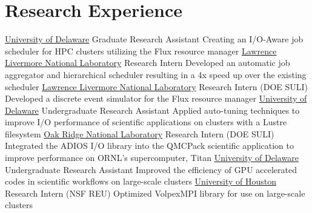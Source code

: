 \section{Research Experience}
		{\href{https://www.udel.edu}{University of Delaware}}
		{Graduate Research Assistant}
		{}{}
		{Creating an I/O-Aware job scheduler for HPC clusters utilizing the Flux resource manager}
		{\href{https://www.llnl.gov}{Lawrence Livermore National Laboratory}}
		{Research Intern}
		{}{}
		{Developed an automatic job aggregator and hierarchical scheduler resulting in a 4x speed up over the existing scheduler}
		{\href{https://www.llnl.gov}{Lawrence Livermore National Laboratory}}
		{Research Intern (DOE SULI)}
		{}{}
		{Developed a discrete event simulator for the Flux resource manager}
		{\href{http://www.udel.edu}{University of Delaware}}
		{Undergraduate Research Assistant}
		{}{}
		{Applied auto-tuning techniques to improve I/O performance of scientific applications on clusters with a Lustre filesystem}
		{\href{https://www.ornl.gov}{Oak Ridge National Laboratory}}
		{Research Intern (DOE SULI)}
		{}{}
		{Integrated the ADIOS I/O library into the QMCPack scientific application to improve performance on ORNL’s supercomputer, Titan}
		{\href{http://www.udel.edu}{University of Delaware}}
		{Undergraduate Research Assistant}
		{}{}
		{Improved the efficiency of GPU accelerated codes in scientific workflows on large-scale clusters}
		{\href{http://uh.edu}{University of Houston}}
		{Research Intern (NSF REU)}
		{}{}
		{Optimized VolpexMPI library for use on large-scale clusters}

